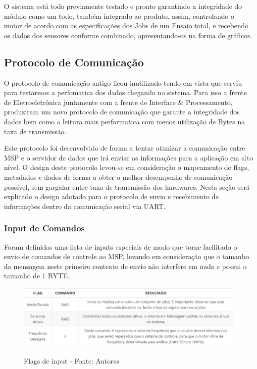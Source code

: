 O sistema está todo previamente testado e pronto garantindo a integridade do módulo como um todo, também integrado ao produto, assim, controlando o motor de acordo com as especificações dos Jobs de um Ensaio total, e recebendo os dados dos sensores conforme combinado, apresentando-os na forma de gráficos.

\subsection{Protocolo de Comunicação}

O protocolo de comunicação antigo ficou inutilizado tendo em vista que serviu para testarmos a perfomatica dos dados chegando no sistema. Para isso a frente de Eletroeletrônica juntamente com a frente de Interface \& Processamento, produziram um novo protocolo de comunicação que garante a integridade dos dados bem como a leitura mais performatica com menos utilização de Bytes na taxa de transmissão.

Este protocolo foi desenvolvido de forma a tentar otimizar a comunicação entre MSP e o servidor de dados que irá enviar as informações para a aplicação em alto nível. O design deste protocolo levou-se em consideração o mapeamento de flags, metadados e dados de forma a obter o melhor desempenho de comunicação possível, sem gargalar entre taxa de transmissão dos hardwares. Nesta seção será explicado o design adotado para o protocolo de envio e recebimento de informações dentro da comunicação serial via UART.

\subsubsection*{Input de Comandos}

Foram definidos uma lista de inputs especiais de modo que torne facilitado o envio de comandos de controle ao MSP, levando em consideração que o tamanho da mensagem neste primeiro contexto de envio não interfere em nada e possui o tamanho de 1 BYTE.

\begin{figure}[H]
\centering
\includegraphics[keepaspectratio=true,scale=0.8]{figuras/flags_input.png}
\label{fig:flags_input}
\caption{Flags de input - Fonte: Autores}
\end{figure}

